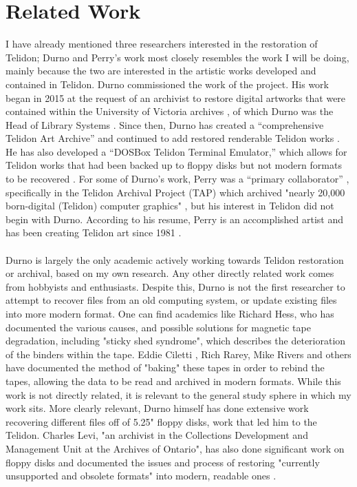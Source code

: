 \documentclass[sigconf]{acmart}
\begin{document}
\section{Related Work}

I have already mentioned three researchers interested in the restoration of Telidon; Durno and Perry’s work most closely resembles the work I will be doing, mainly because the two are interested in the artistic works developed and contained in Telidon. Durno commissioned the work of the project. His work began in 2015 at the request of an archivist to restore digital artworks that were contained within the University of Victoria archives \cite{durno_gallery}, of which Durno was the Head of Library Systems \cite{durno_2022}. Since then, Durno has created a “comprehensive Telidon Art Archive” and continued to add restored renderable Telidon works \cite{durno_2022}. He has also developed a “DOSBox Telidon Terminal Emulator,” which allows for Telidon works that had been backed up to floppy disks but not modern formats to be recovered \cite{durno_2022}. For some of Durno’s work, Perry was a “primary collaborator” \cite{durno_2022}, specifically in the Telidon Archival Project (TAP) which archived "nearly 20,000 born-digital (Telidon) computer graphics" \cite{tap}, but his interest in Telidon did not begin with Durno. According to his resume, Perry is an accomplished artist and has been creating Telidon art since 1981 \cite{perry}. \\ \\ 

Durno is largely the only academic actively working towards Telidon restoration or archival, based on my own research. Any other directly related work comes from hobbyists and enthusiasts. Despite this, Durno is not the first researcher to attempt to recover files from an old computing system, or update existing files into more modern format. One can find academics like Richard Hess, who has documented the various causes, and possible solutions for magnetic tape degradation, including "sticky shed syndrome", which describes the deterioration of the binders within the tape\cite{hess_2008}. Eddie Ciletti \cite{ciletti_1998}, Rich Rarey\cite{rarey_1995}, Mike Rivers \cite{rivers_newton} and others have documented the method of "baking" these tapes in order to rebind the tapes, allowing the data to be read and archived in modern formats. While this work is not directly related, it is relevant to the general study sphere in which my work sits. More clearly relevant, Durno himself has done extensive work recovering different files off of 5.25" \cite{durno_trofimchuk_2015} floppy disks, work that led him to the Telidon. Charles Levi, "an archivist in the Collections Development and Management Unit at the Archives of Ontario", has also done significant work on floppy disks and documented the issues and process of restoring "currently unsupported and obsolete formats" into modern, readable ones \cite{levi2011five}.
\end{document}
